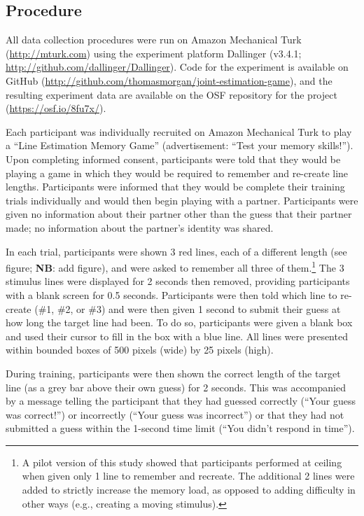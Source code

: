 \documentclass[10pt, letterpaper]{article}
\begin{document}
\subsection{Procedure}\label{procedure}

All data collection procedures were run on Amazon Mechanical Turk
(\url{http://mturk.com}) using the experiment platform Dallinger
(v3.4.1; \url{http://github.com/dallinger/Dallinger}). Code for the
experiment is available on GitHub
(\url{http://github.com/thomasmorgan/joint-estimation-game}), and the
resulting experiment data are available on the OSF repository for the
project (\url{https://osf.io/8fu7x/}).

Each participant was individually recruited on Amazon Mechanical Turk to
play a ``Line Estimation Memory Game'' (advertisement: ``Test your
memory skills!''). Upon completing informed consent, participants were
told that they would be playing a game in which they would be required
to remember and re-create line lengths. Participants were informed that
they would be complete their training trials individually and would then
begin playing with a partner. Participants were given no information
about their partner other than the guess that their partner made; no
information about the partner's identity was shared.

In each trial, participants were shown 3 red lines, each of a different
length (see figure; \textbf{NB}: add figure), and were asked to remember
all three of
them.\footnote{A pilot version of this study showed that participants performed at ceiling when given only 1 line to remember and recreate. The additional 2 lines were added to strictly increase the memory load, as opposed to adding difficulty in other ways (e.g., creating a moving stimulus).}
The 3 stimulus lines were displayed for 2 seconds then removed,
providing participants with a blank screen for 0.5 seconds. Participants
were then told which line to re-create (\#1, \#2, or \#3) and were then
given 1 second to submit their guess at how long the target line had
been. To do so, participants were given a blank box and used their
cursor to fill in the box with a blue line. All lines were presented
within bounded boxes of 500 pixels (wide) by 25 pixels (high).

During training, participants were then shown the correct length of the
target line (as a grey bar above their own guess) for 2 seconds. This
was accompanied by a message telling the participant that they had
guessed correctly (``Your guess was correct!'') or incorrectly (``Your
guess was incorrect'') or that they had not submitted a guess within the
1-second time limit (``You didn't respond in time'').
\end{document}
